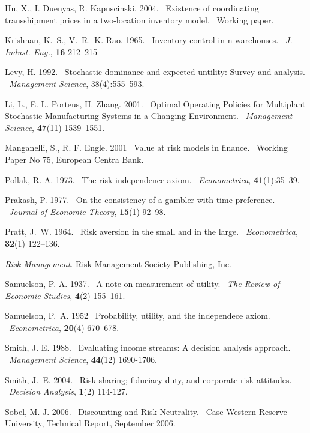 \documentclass[mnsc,nonblindrev,copyedit]{informs2_wz} %
\def\newblock{\ }%
\begin{document}
\begin{thebibliography}{1}
Hu, X., I. Duenyas, R. Kapuscinski. 2004.
\newblock Existence of coordinating transshipment prices in a two-location
  inventory model.
\newblock Working paper.

Krishnan, K.~S., V.~R.~K. Rao. 1965.
\newblock Inventory control in n warehouses.
\newblock {\em J. Indust. Eng.}, {\bf 16} 212--215

Levy, H. 1992.
\newblock Stochastic dominance and expected untility: Survey and analysis.
\newblock {\em Management Science}, 38(4):555--593.

Li, L., E. L. Porteus, H. Zhang. 2001.
\newblock Optimal Operating Policies for Multiplant Stochastic Manufacturing
  Systems in a Changing Environment.
\newblock {\em Management Science}, {\bf 47}(11) 1539--1551.

Manganelli, S., R. F. Engle. 2001
\newblock Value at risk models in finance.
\newblock Working Paper No 75, European Centra Bank.

Pollak, R. A. 1973.
\newblock The risk independence axiom.
\newblock {\em Econometrica}, {\bf 41}(1):35--39.

Prakash, P. 1977.
\newblock On the consistency of a gambler with time preference.
\newblock {\em Journal of Economic Theory}, {\bf 15}(1) 92--98.

Pratt, J.~W. 1964.
\newblock Risk aversion in the small and in the large.
\newblock {\em Econometrica}, {\bf 32}(1) 122--136.

{\em Risk Management}. Risk Management Society Publishing, Inc.

Samuelson, P. A. 1937.
\newblock A note on measurement of utility.
\newblock {\em The Review of Economic Studies}, {\bf 4}(2) 155--161.

Samuelson, P.~A. 1952
\newblock Probability, utility, and the independece axiom.
\newblock {\em Econometrica}, {\bf 20}(4) 670--678.

Smith, J. E. 1988.
\newblock Evaluating income streams: A decision analysis approach.
\newblock {\em Management Science}, {\bf 44}(12) 1690-1706.

Smith, J.~E. 2004.
\newblock Risk sharing; fiduciary duty, and corporate risk attitudes.
\newblock {\em Decision Analysis}, {\bf 1}(2) 114-127.

Sobel, M. J. 2006.
\newblock Discounting and Risk Neutrality.
\newblock Case Western Reserve University, Technical Report, September 2006.


\end{thebibliography}
\end{document}
